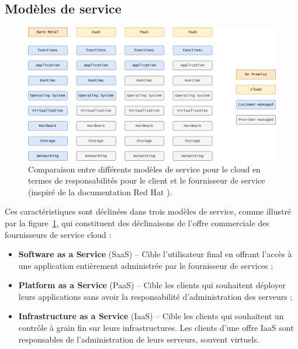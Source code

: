 \subsection{Modèles de service}

\begin{figure}[htbp]
    \centering
	\includegraphics[width=\textwidth]{3_Chapitre1/figures/service-models.png}
	\caption[Comparaison entre différents modèles de service pour le cloud en termes de responsabilités pour le client et le fournisseur de service.]{Comparaison entre différents modèles de service pour le cloud en termes de responsabilités pour le client et le fournisseur de service (inspiré de la documentation Red Hat \protect \footnotemark).}
	\label{fig:service-model}
\end{figure}


Ces caractéristiques sont déclinées dans trois modèles de service, comme illustré par la figure~\ref{fig:service-model}, qui constituent des déclinaisons de l'offre commerciale des fournisseurs de service cloud :

\begin{itemize}
    \item \textbf{Software as a Service} (SaaS) -- Cible l'utilisateur final en offrant l'accès à une application entièrement administrée par le fournisseur de services ;
    \item \textbf{Platform as a Service} (PaaS) -- Cible les clients qui souhaitent déployer leurs applications sans avoir la responsabilité d'administration des serveurs ;
    \item \textbf{Infrastructure as a Service} (IaaS) -- Cible les clients qui souhaitent un contrôle à grain fin sur leurs infrastructures. Les clients d'une offre IaaS sont responsables de l'administration de leurs serveurs, souvent virtuels. 
\end{itemize}

